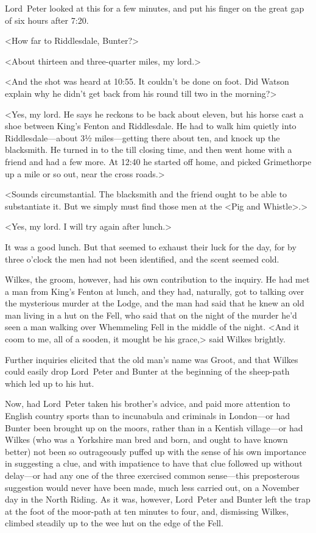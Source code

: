 \begin{a4}
\clearpage
\end{a4}

Lord~Peter looked at this for a few minutes, and put his finger on the great gap of six hours after 7:20.

<How far to Riddlesdale, Bunter?>

<About thirteen and three-quarter miles, my lord.>

<And the shot was heard at 10:55. It couldn't be done on foot. Did Watson explain why he didn't get back from his round till two in the morning?>

<Yes, my lord. He says he reckons to be back about eleven, but his horse cast a shoe between King's Fenton and Riddlesdale. He had to walk him quietly into Riddlesdale—about 3½ miles—getting there about ten, and knock up the blacksmith. He turned in to the  till closing time, and then went home with a friend and had a few more. At 12:40 he started off home, and picked Grimethorpe up a mile or so out, near the cross roads.>

<Sounds circumstantial. The blacksmith and the friend ought to be able to substantiate it. But we simply must find those men at the <Pig and Whistle>.>

<Yes, my lord. I will try again after lunch.>

It was a good lunch. But that seemed to exhaust their luck for the day, for by three o'clock the men had not been identified, and the scent seemed cold.

Wilkes, the groom, however, had his own contribution to the inquiry. He had met a man from King's Fenton at lunch, and they had, naturally, got to talking over the mysterious murder at the Lodge, and the man had said that he knew an old man living in a hut on the Fell, who said that on the night of the murder he'd seen a man walking over Whemmeling Fell in the middle of the night. <And it coom to me, all of a sooden, it mought be his grace,> said Wilkes brightly.

Further inquiries elicited that the old man's name was Groot, and that Wilkes could easily drop Lord~Peter and Bunter at the beginning of the sheep-path which led up to his hut.

Now, had Lord~Peter taken his brother's advice, and paid more attention to English country sports than to incunabula and criminals in London—or had Bunter been brought up on the moors, rather than in a Kentish village—or had Wilkes (who was a Yorkshire man bred and born, and ought to have known better) not been so outrageously puffed up with the sense of his own importance in suggesting a clue, and with impatience to have that clue followed up without delay—or had any one of the three exercised common sense—this preposterous suggestion would never have been made, much less carried out, on a November day in the North Riding. As it was, however, Lord~Peter and Bunter left the trap at the foot of the moor-path at ten minutes to four, and, dismissing Wilkes, climbed steadily up to the wee hut on the edge of the Fell.

